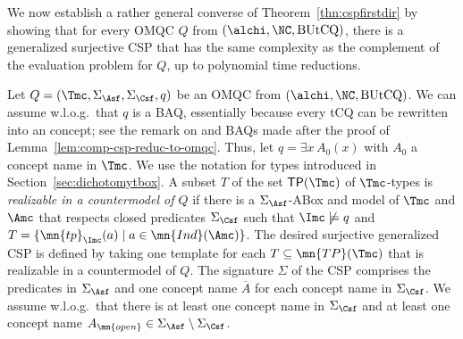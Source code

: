 \documentclass{lmcs}
\theoremstyle{definition}
\begin{document}

\smallskip

We now establish a rather general converse of Theorem~\ref{thn:cspfirstdir} by
showing that for every OMQC $Q$ from
$(\alchi,\NC,\text{BUtCQ})$, there is a generalized
surjective CSP %
that has the same complexity as the complement of the evaluation problem for $Q$, up to polynomial time
reductions. 

%
Let $Q=(\Tmc,\Sigma_\Asf,\Sigma_\Csf,q)$ be an OMQC from
$(\alchi,\NC,\text{BUtCQ})$.  We can assume w.l.o.g.\ that $q$ is a
BAQ, essentially because every tCQ can be rewritten into an \ALCI
concept; see the remark on \EL and BAQs made after the proof of
Lemma~\ref{lem:comp-csp-reduc-to-omqc}. Thus, let $q=\exists x \, A_{0}(x)$
with $A_{0}$ a concept name in $\Tmc$.
%
We use the notation for types introduced in
Section~\ref{sec:dichotomytbox}. A subset $T$ of the set
${\sf TP}(\Tmc)$ of $\Tmc$-types is \emph{realizable in a
  countermodel of $Q$} if there is a $\Sigma_\Asf$-ABox \Amc and model \Imc
of $\Tmc$ and $\Amc$ that respects closed predicates $\Sigma_\Csf$
such that $\Imc \not\models q$ and
$T = \{ \mn{tp}_\Imc(a) \mid a \in \mn{Ind}(\Amc) \}$.
The desired surjective generalized CSP is defined by taking one template for each 
$T \subseteq \mn{TP}(\Tmc)$ that is realizable in a countermodel of $Q$. 
The signature $\Sigma$ of the CSP comprises the predicates
in $\Sigma_\Asf$ and one concept name $\overline{A}$ for each concept name in $\Sigma_\Csf$. We assume
w.l.o.g.\ that there is at least one concept name in $\Sigma_{\Csf}$
and at least one concept name $A_{\mn{open}} \in \Sigma_{\Asf}
\setminus \Sigma_{\Csf}$.
\end{document}
